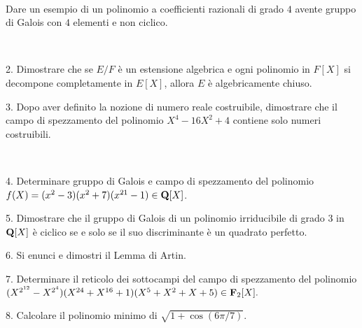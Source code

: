 \ \dotfill\ \bigskip\bigskip\bigskip\vfil

 Dare un esempio di un polinomio a coefficienti razionali di grado $4$ avente gruppo di Galois
con $4$ elementi e non ciclico.\medskip\bigskip\bigskip

\ \dotfill\ \bigskip\bigskip\bigskip


\vfil\eject


\item{2.} Dimostrare che se $E/F$ \`e un estensione algebrica e ogni polinomio in $F[X]$ si decompone completamente in
$E[X]$, allora $E$ \`e algebricamente chiuso.

\vv


\item{3.} Dopo aver definito la nozione di numero reale costruibile, dimostrare che il campo di spezzamento del polinomio
$X^4-16X^2+4$ contiene solo numeri costruibili.

\ve\ \vs


\item{4.} Determinare gruppo di Galois e campo di spezzamento del polinomio $f(X)=(x^2-3)(x^2+7)(x^{21}-1) \in{\bf Q}[X]$. \vv

\item{5.} Dimostrare che il gruppo di Galois di un polinomio irriducibile di grado 3 in ${\bf Q}[X]$ \`e ciclico se
e solo se il suo discriminante \`e un quadrato perfetto.
\ve\ \vs


\item{6.} Si enunci e dimostri il Lemma di Artin.\vv\vv


\item{7.} Determinare il reticolo dei sottocampi del campo di spezzamento del polinomio 
$(X^{2^{12}}-X^{2^{4}})(X^{24}+X^{16}+1)(X^{5}+X^2+X+5)\in{\bf F}_2[X].$\vv\vv

\item{8.} Calcolare il polinomio minimo di $\sqrt{1+\cos(6\pi/7)}$.

\ \vst
 \bye
